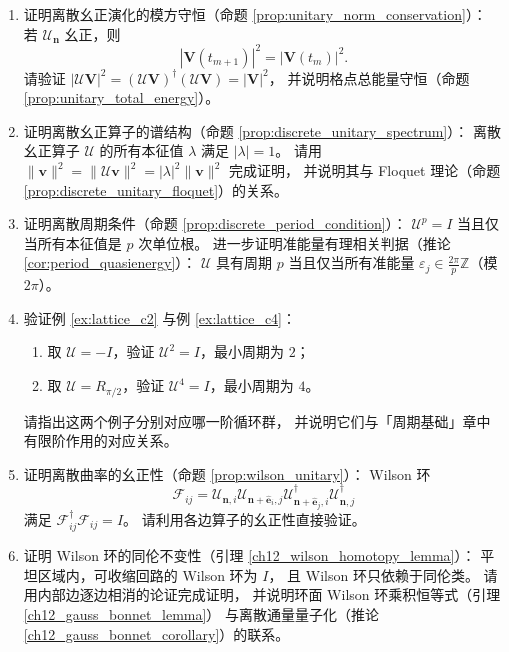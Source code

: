 \begin{enumerate}[leftmargin=3em, label=\textbf{题 \arabic*}]
    \item 证明离散幺正演化的模方守恒（命题 \ref{prop:unitary_norm_conservation}）：
    若 $\mathcal{U}_{\mathbf{n}}$ 幺正，则
    \[
    |\mathbf{V}(t_{m+1})|^2=|\mathbf{V}(t_m)|^2.
    \]
    请验证 $|\mathcal{U}\mathbf{V}|^2=(\mathcal{U}\mathbf{V})^\dagger(\mathcal{U}\mathbf{V})=|\mathbf{V}|^2$，
    并说明格点总能量守恒（命题 \ref{prop:unitary_total_energy}）。

    \item 证明离散幺正算子的谱结构（命题 \ref{prop:discrete_unitary_spectrum}）：
    离散幺正算子 $\mathcal{U}$ 的所有本征值 $\lambda$ 满足 $|\lambda|=1$。
    请用 $\|\mathbf{v}\|^2=\|\mathcal{U}\mathbf{v}\|^2=|\lambda|^2\|\mathbf{v}\|^2$ 完成证明，
    并说明其与 Floquet 理论（命题 \ref{prop:discrete_unitary_floquet}）的关系。

    \item 证明离散周期条件（命题 \ref{prop:discrete_period_condition}）：
    $\mathcal{U}^p=I$ 当且仅当所有本征值是 $p$ 次单位根。
    进一步证明准能量有理相关判据（推论 \ref{cor:period_quasienergy}）：
    $\mathcal{U}$ 具有周期 $p$ 当且仅当所有准能量
    $\varepsilon_j\in\frac{2\pi}{p}\mathbb{Z}$（模 $2\pi$）。

    \item 验证例 \ref{ex:lattice_c2} 与例 \ref{ex:lattice_c4}：
    \begin{enumerate}[label=(\roman*)]
        \item 取 $\mathcal{U}=-I$，验证 $\mathcal{U}^2=I$，最小周期为 $2$；
        \item 取 $\mathcal{U}=R_{\pi/2}$，验证 $\mathcal{U}^4=I$，最小周期为 $4$。
    \end{enumerate}
    请指出这两个例子分别对应哪一阶循环群，
    并说明它们与「周期基础」章中有限阶作用的对应关系。

    \item 证明离散曲率的幺正性（命题 \ref{prop:wilson_unitary}）：
    Wilson 环
    \[
    \mathcal{F}_{ij}
    =\mathcal{U}_{\mathbf{n},i}\mathcal{U}_{\mathbf{n}+\hat{\mathbf{e}}_i,j}
    \mathcal{U}_{\mathbf{n}+\hat{\mathbf{e}}_j,i}^\dagger
    \mathcal{U}_{\mathbf{n},j}^\dagger
    \]
    满足 $\mathcal{F}_{ij}^\dagger\mathcal{F}_{ij}=I$。
    请利用各边算子的幺正性直接验证。

    \item 证明 Wilson 环的同伦不变性（引理 \ref{ch12_wilson_homotopy_lemma}）：
    平坦区域内，可收缩回路的 Wilson 环为 $I$，
    且 Wilson 环只依赖于同伦类。
    请用内部边逐边相消的论证完成证明，
    并说明环面 Wilson 环乘积恒等式（引理 \ref{ch12_gauss_bonnet_lemma}）
    与离散通量量子化（推论 \ref{ch12_gauss_bonnet_corollary}）的联系。


\end{enumerate}
